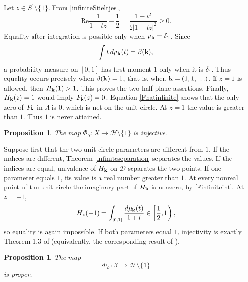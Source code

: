 \documentclass[12pt,a4paper]{amsart}
\makeatletter
\numberwithin{equation}{section}
\renewenvironment{proof}[1][Proof]{%
  \par\pushQED{\qed}%
  \normalfont\topsep6\p@\@plus6\p@\relax
  \trivlist
  \item[\hskip\labelsep\bfseries #1:]\ignorespaces
}{%
  \popQED\endtrivlist\@endpefalse
}
\theoremstyle{plain}
\newtheorem{prop}[Thm]{Proposition}
\theoremstyle{definition}
\makeatother
\begin{document}
\begin{proof}
Let $z\in S^1\setminus\{1\}$.  From \eqref{infiniteStieltjes},
\begin{equation}\label{halfplanekernel}
\mathrm{Re}\frac1{1-tz}-\frac12
=\frac{1-t^2}{2|1-tz|^2}\geq0.
\end{equation}
Equality after integration is possible only when $\mu_{\bf k}=\delta_1$.  Since
\[
\int t\,d\mu_{\bf k}(t)=\beta({\bf k}),
\]
a probability measure on $[0,1]$ has first moment $1$ only when it is $\delta_1$.  Thus equality occurs precisely when $\beta({\bf k})=1$, that is, when ${\bf k}=(1,1,\ldots)$.  If $z=1$ is allowed, then
$H_{\bf k}(1)>1$.  This proves the two half-plane assertions. Finally, $H_{\bf k}(z)=1$ would imply $F_{\bf k}(z)=0$.  Equation \eqref{Fhatinfinite} shows that the only zero of $F_{\bf k}$ in $\Lambda$ is $0$, which is not on the unit circle.  At $z=1$ the value is greater than $1$.  Thus $1$ is never attained.
\end{proof}

\begin{prop}\label{Phiinjective}
The map $\Phi_{\mathcal{S}}:X\rightarrow\mathcal{H}\setminus\{1\}$ is injective.
\end{prop}

\begin{proof}
Suppose first that the two unit-circle parameters are different from $1$.  If the indices are different, Theorem \ref{infiniteseparation} separates the values.  If the indices are equal, univalence of $H_{\bf k}$ on $\mathcal{D}$ separates the two points.
If one parameter equals $1$, its value is a real number greater than $1$.  At every nonreal point of the unit circle the imaginary part of $H_{\bf k}$ is nonzero, by \eqref{Finfiniteint}.  At $z=-1$,
\[
H_{\bf k}(-1)=\int_{[0,1]}\frac{d\mu_{\bf k}(t)}{1+t}
\in\left[\frac12,1\right),
\]
so equality is again impossible.  If both parameters equal $1$, injectivity is exactly Theorem 1.3 of \cite{lit} (equivalently, the corresponding result of \cite{hmo}).
\end{proof}

\begin{prop}\label{Phiproper}
The map
\[
\Phi_{\mathcal{S}}:X\rightarrow\mathcal{H}\setminus\{1\}
\]
is proper.
\end{prop}
\end{document}
